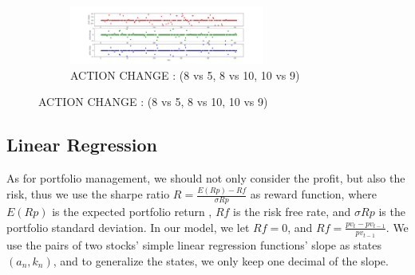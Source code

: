 \begin{figure}[H]
\begin{figure}[H]
\begin{center}
\end{center}
\end{figure}
\begin{figure}[H]
\begin{center}
\includegraphics[clip, width=0.7\textwidth]{Graphics/actionchange3.jpg} \caption{ACTION CHANGE : (8 vs 5, 8 vs 10, 10 vs 9)}
\end{center}
\end{figure}
\end{figure}

\subsection{Linear Regression}
As for portfolio management, we should not only consider the  profit, but also the risk, thus we use the sharpe ratio $R=\frac{E(Rp)-Rf}{\sigma Rp}$ as reward function, where $E(Rp)$ is the expected portfolio return , $Rf$ is the risk free rate, and $\sigma Rp$ is the portfolio standard deviation. In our model, we let $Rf=0$, and $Rf=\frac{pv_t-pv_{t-1}}{pv_{t-1}}$. We use the pairs of two stocks’ simple linear regression functions’ slope as states $(a_n,k_n)$, and to generalize the states, we only keep one decimal of the slope.

\vspace{0.5cm}

